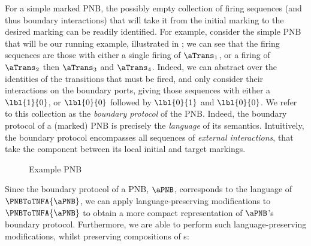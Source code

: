 For a simple marked PNB, the possibly empty collection of firing sequences (and
thus boundary interactions) that will take it from the initial marking to the
desired marking can be readily identified. For example, consider the simple PNB
that will be our running example, illustrated in ; we
can see that the firing sequences are those with either a single firing of
$\aTrans_1$, or a firing of $\aTrans_2$ then $\aTrans_3$ and $\aTrans_4$.
Indeed, we can abstract over the identities of the transitions that must be
fired, and only consider their interactions on the boundary ports, giving those
sequences with either a $\lbl{1}{0}$, or $\lbl{0}{0}$ followed by $\lbl{0}{1}$
and $\lbl{0}{0}$. We refer to this collection as the \emph{boundary protocol}
of the PNB\@. Indeed, the boundary protocol of a (marked) PNB is precisely the
\emph{language} of its \TNFA{} semantics.  Intuitively, the boundary protocol
encompasses all sequences of \emph{external interactions}, that take the
component between its local initial and target markings.

\begin{figure}[ht]
    \centering
    \caption{Example PNB}
    \label{fig:examplePNB}
\end{figure}

Since the boundary protocol of a PNB, $\aPNB$, corresponds to the language of
$\PNBToTNFA{\aPNB}$, we can apply language-preserving modifications to
$\PNBToTNFA{\aPNB}$ to obtain a more compact representation of $\aPNB$'s
boundary protocol. Furthermore, we are able to perform such language-preserving
modifications, whilst preserving compositions of \TNFA{}s:

